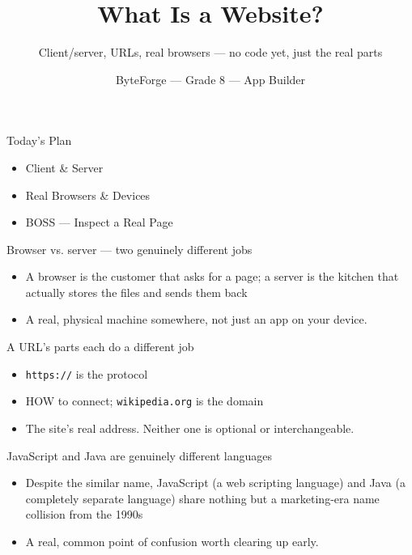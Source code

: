 \documentclass[aspectratio=169]{beamer}
\title{What Is a Website?}
\subtitle{Client/server, URLs, real browsers — no code yet, just the real parts}
\author{ByteForge --- Grade 8 --- App Builder}
\date{}
\begin{document}
\begin{frame}
    \titlepage
\end{frame}

\begin{frame}{Today's Plan}
    \begin{itemize}
        \item Client \& Server
        \item Real Browsers \& Devices
        \item[$\bigstar$] BOSS --- Inspect a Real Page
    \end{itemize}
\end{frame}

\begin{frame}{Browser vs. server — two genuinely different jobs}
    \large
    \begin{itemize}
        \item A browser is the customer that asks for a page; a server is the kitchen that actually stores the files and sends them back
        \item A real, physical machine somewhere, not just an app on your device.
    \end{itemize}
\end{frame}


\begin{frame}{A URL's parts each do a different job}
    \large
    \begin{itemize}
        \item \texttt{https://} is the protocol
        \item HOW to connect; \texttt{wikipedia.org} is the domain
        \item The site's real address. Neither one is optional or interchangeable.
    \end{itemize}
\end{frame}


\begin{frame}{JavaScript and Java are genuinely different languages}
    \large
    \begin{itemize}
        \item Despite the similar name, JavaScript (a web scripting language) and Java (a completely separate language) share nothing but a marketing-era name collision from the 1990s
        \item A real, common point of confusion worth clearing up early.
    \end{itemize}
\end{frame}
\end{document}
